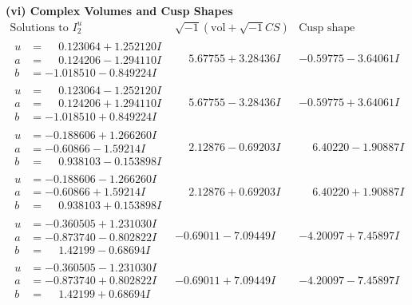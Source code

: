 \documentclass[1p]{elsarticle_modified}
\theoremstyle{definition}
\newcommand{\I}{\sqrt{-1}}
\begin{document}
\newpage\flushleft \textbf{(vi) Complex Volumes and Cusp Shapes}
$$\begin{array}{c|c|c}  
\text{Solutions to }I^u_{2}& \I (\text{vol} + \sqrt{-1}CS) & \text{Cusp shape}\\
 \hline 
\begin{aligned}
u &= \phantom{-}0.123064 + 1.252120 I \\
a &= \phantom{-}0.124206 - 1.294110 I \\
b &= -1.018510 - 0.849224 I\end{aligned}
 & \phantom{-}5.67755 + 3.28436 I & -0.59775 - 3.64061 I \\ \hline\begin{aligned}
u &= \phantom{-}0.123064 - 1.252120 I \\
a &= \phantom{-}0.124206 + 1.294110 I \\
b &= -1.018510 + 0.849224 I\end{aligned}
 & \phantom{-}5.67755 - 3.28436 I & -0.59775 + 3.64061 I \\ \hline\begin{aligned}
u &= -0.188606 + 1.266260 I \\
a &= -0.60866 - 1.59214 I \\
b &= \phantom{-}0.938103 - 0.153898 I\end{aligned}
 & \phantom{-}2.12876 - 0.69203 I & \phantom{-}6.40220 - 1.90887 I \\ \hline\begin{aligned}
u &= -0.188606 - 1.266260 I \\
a &= -0.60866 + 1.59214 I \\
b &= \phantom{-}0.938103 + 0.153898 I\end{aligned}
 & \phantom{-}2.12876 + 0.69203 I & \phantom{-}6.40220 + 1.90887 I \\ \hline\begin{aligned}
u &= -0.360505 + 1.231030 I \\
a &= -0.873740 - 0.802822 I \\
b &= \phantom{-}1.42199 - 0.68694 I\end{aligned}
 & -0.69011 - 7.09449 I & -4.20097 + 7.45897 I \\ \hline\begin{aligned}
u &= -0.360505 - 1.231030 I \\
a &= -0.873740 + 0.802822 I \\
b &= \phantom{-}1.42199 + 0.68694 I\end{aligned}
 & -0.69011 + 7.09449 I & -4.20097 - 7.45897 I \\ \hline\begin{aligned}

\end{aligned}
\end{array}$$
\end{document}
